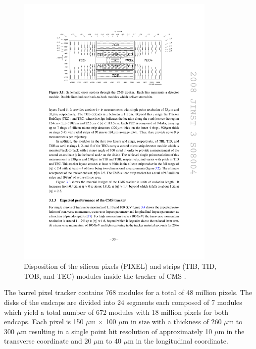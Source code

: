     \begin{figure}[b!]
      \centering
      \includegraphics[width=0.86\textwidth]{img/I-3-cms/tracker.pdf}
      \caption{Disposition of the silicon pixels (PIXEL) and strips (TIB, TID, TOB, and TEC) modules inside the tracker of CMS \cite{1748-0221-3-08-S08004}.}
      \label{fig:I-3-tracker}
    \end{figure}

    The barrel pixel tracker contains 768 modules for a total of 48 million pixels. The disks of the endcaps are divided into 24 segments each composed of 7 modules which yield a total number of 672 modules with 18 million pixels for both endcaps. Each pixel is 150 $\mu$m $\times$ 100 $\mu$m in size with a thickness of 260 $\mu$m to 300 $\mu$m resulting in a single point hit resolution of approximately 10 $\mu$m in the transverse coordinate and 20 $\mu$m to 40 $\mu$m in the longitudinal coordinate. \\

